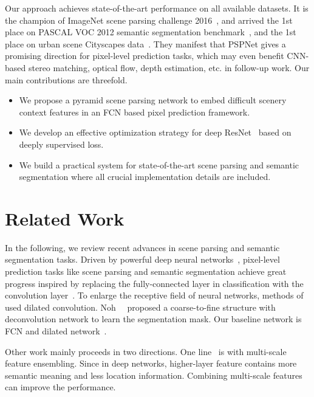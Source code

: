 \documentclass[10pt,twocolumn,letterpaper]{article}
\begin{document}
Our approach achieves state-of-the-art performance on all available datasets. It is the
champion of ImageNet scene parsing challenge 2016~\cite{zhou2016semantic}, and arrived
the 1st place on PASCAL VOC 2012 semantic segmentation
benchmark~\cite{everingham2010pascal}, and the 1st place on urban scene Cityscapes
data~\cite{cordts2016cityscapes}. They manifest that PSPNet gives a promising direction
for pixel-level prediction tasks, which may even benefit CNN-based stereo matching,
optical flow, depth estimation, etc. in follow-up work. Our main contributions are
threefold.
\begin{itemize}
\vspace{-0.1cm}
\item 
We propose a pyramid scene parsing network to embed difficult scenery context features in
an FCN based pixel prediction framework. \vspace{-0.1cm}
\item 
We develop an effective optimization strategy for deep ResNet~\cite{he2015deep} based on
deeply supervised loss. \vspace{-0.1cm}
\item 
We build a practical system for state-of-the-art scene parsing and semantic segmentation
where all crucial implementation details are included.
\end{itemize}

\section{Related Work}

In the following, we review recent advances in scene parsing and semantic segmentation
tasks. Driven by powerful deep neural
networks~\cite{krizhevsky2012imagenet,simonyan2014very,szegedy2015going,he2015deep},
pixel-level prediction tasks like scene parsing and semantic segmentation achieve great
progress inspired by replacing the fully-connected layer in classification with the
convolution layer~\cite{long2015fully}. To enlarge the receptive field of neural
networks, methods of~\cite{chen2014semantic,yu2015multi} used dilated convolution.
Noh~\etal~\cite{noh2015learning} proposed a coarse-to-fine structure with deconvolution
network to learn the segmentation mask. Our baseline network is FCN and dilated
network~\cite{long2015fully,chen2014semantic}.

Other work mainly proceeds in two directions. One
line~\cite{long2015fully,chen2014semantic,chen2015attention,xia2016zoom,hariharan2015hypercolumns}
is with multi-scale feature ensembling. Since in deep networks, higher-layer feature
contains more semantic meaning and less location information. Combining multi-scale
features can improve the performance.
\end{document}
